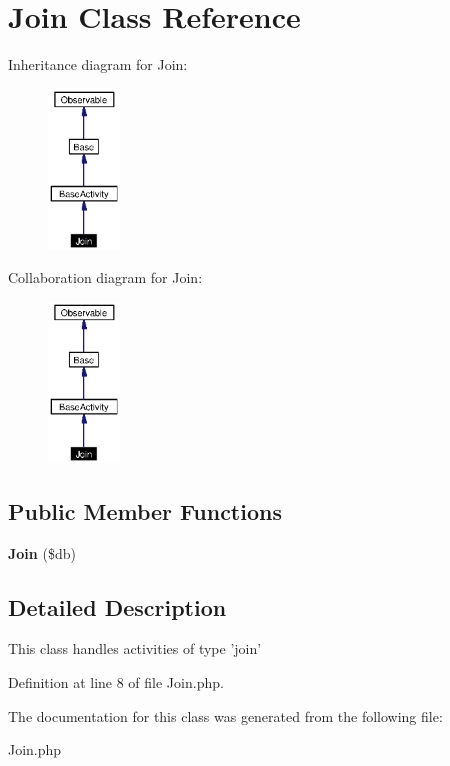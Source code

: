 \section{Join Class Reference}
\label{classJoin}
Inheritance diagram for Join:\begin{figure}[H]
\begin{center}
\leavevmode
\includegraphics[width=54pt]{classJoin__inherit__graph}
\end{center}
\end{figure}
Collaboration diagram for Join:\begin{figure}[H]
\begin{center}
\leavevmode
\includegraphics[width=54pt]{classJoin__coll__graph}
\end{center}
\end{figure}
\subsection*{Public Member Functions}
\begin{CompactItemize}
\item 
{\bf Join} (\$db)\label{classJoin_a0}

\end{CompactItemize}


\subsection{Detailed Description}
This class handles activities of type 'join' 



Definition at line 8 of file Join.php.

The documentation for this class was generated from the following file:\begin{CompactItemize}
\item 
Join.php\end{CompactItemize}
